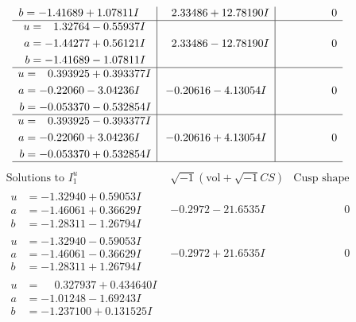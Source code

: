 \documentclass[1p]{elsarticle_modified}
\theoremstyle{definition}
\newcommand{\I}{\sqrt{-1}}
\begin{document}
$$\begin{array}{c|c|c}
\begin{aligned}
b &= -1.41689 + 1.07811 I\end{aligned}
 & \phantom{-}2.33486 + 12.78190 I & \phantom{-0.000000 } 0 \\ \hline\begin{aligned}
u &= \phantom{-}1.32764 - 0.55937 I \\
a &= -1.44277 + 0.56121 I \\
b &= -1.41689 - 1.07811 I\end{aligned}
 & \phantom{-}2.33486 - 12.78190 I & \phantom{-0.000000 } 0 \\ \hline\begin{aligned}
u &= \phantom{-}0.393925 + 0.393377 I \\
a &= -0.22060 - 3.04236 I \\
b &= -0.053370 - 0.532854 I\end{aligned}
 & -0.20616 - 4.13054 I & \phantom{-0.000000 } 0 \\ \hline\begin{aligned}
u &= \phantom{-}0.393925 - 0.393377 I \\
a &= -0.22060 + 3.04236 I \\
b &= -0.053370 + 0.532854 I\end{aligned}
 & -0.20616 + 4.13054 I & \phantom{-0.000000 } 0\\
 \hline 
 \end{array}$$\newpage$$\begin{array}{c|c|c}  
\text{Solutions to }I^u_{1}& \I (\text{vol} + \sqrt{-1}CS) & \text{Cusp shape}\\
 \hline 
\begin{aligned}
u &= -1.32940 + 0.59053 I \\
a &= -1.46061 + 0.36629 I \\
b &= -1.28311 - 1.26794 I\end{aligned}
 & -0.2972 - 21.6535 I & \phantom{-0.000000 } 0 \\ \hline\begin{aligned}
u &= -1.32940 - 0.59053 I \\
a &= -1.46061 - 0.36629 I \\
b &= -1.28311 + 1.26794 I\end{aligned}
 & -0.2972 + 21.6535 I & \phantom{-0.000000 } 0 \\ \hline\begin{aligned}
u &= \phantom{-}0.327937 + 0.434640 I \\
a &= -1.01248 - 1.69243 I \\
b &= -1.237100 + 0.131525 I\end{aligned}

\end{array}$$
\end{document}

